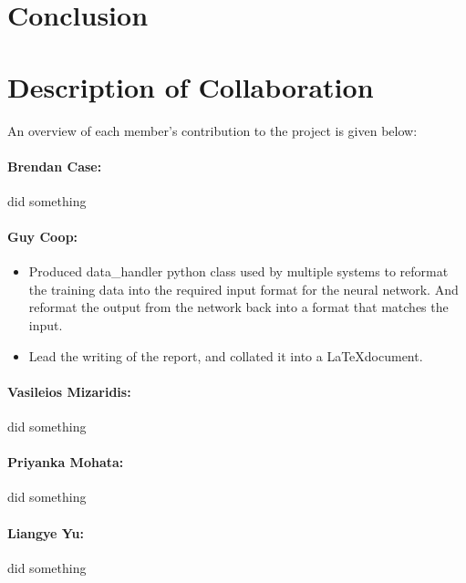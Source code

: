 \documentclass[10pt]{article}
\begin{document}
\section{Conclusion}

\section{Description of Collaboration}
An overview of each member's contribution to the project is given below:
\paragraph{Brendan Case:}
did something

\paragraph{Guy Coop:}
\begin{itemize}
	\item Produced data\_handler python class used by multiple systems to reformat the training data into the required input format for the neural network. And reformat the output from the network back into a format that matches the input.
	\item Lead the writing of the report, and collated it into a \LaTeX document.
\end{itemize}

\paragraph{Vasileios Mizaridis:}
did something

\paragraph{Priyanka Mohata:}
did something

\paragraph{Liangye Yu:}
did something

\newpage


\end{document}
